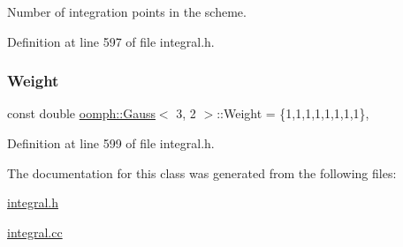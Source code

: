 Number of integration points in the scheme. 



Definition at line 597 of file integral.\+h.

\mbox{\label{classoomph_1_1Gauss_3_013_00_012_01_4_acef38067755c8a3cf352f70f4ccfe8bc}} 
\subsubsection{\texorpdfstring{Weight}{Weight}}
{\footnotesize\ttfamily const double \hyperlink{classoomph_1_1Gauss}{oomph\+::\+Gauss}$<$ 3, 2 $>$\+::Weight = \{1,1,1,1,1,1,1,1\}\hspace{0.3cm}{\ttfamily [static]}, {\ttfamily [private]}}



Definition at line 599 of file integral.\+h.



The documentation for this class was generated from the following files\+:\begin{DoxyCompactItemize}
\item 
\hyperlink{integral_8h}{integral.\+h}\item 
\hyperlink{integral_8cc}{integral.\+cc}\end{DoxyCompactItemize}
